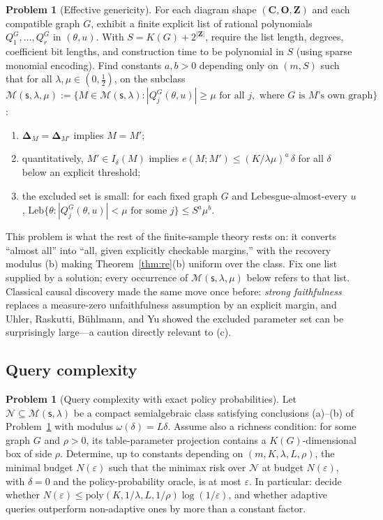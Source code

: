 \documentclass[11pt]{amsart}
\theoremstyle{plain}
\theoremstyle{definition}
\newtheorem{problem}[theorem]{Problem}
\newcommand{\bC}{\mathbf{C}}
\newcommand{\bO}{\mathbf{O}}
\newcommand{\bZ}{\mathbf{Z}}
\newcommand{\MM}{\mathcal{M}}
\newcommand{\sk}{\mathsf{s}}
\begin{document}
\begin{problem}[Effective genericity]\label{prob:effective}
For each diagram shape $(\bC,\bO,\bZ)$ and each compatible graph $G$, exhibit a finite explicit list of rational polynomials $Q^G_1,\dots,Q^G_r$ in $(\theta,u)$. With $S=K(G)+2^{|\bZ|}$, require the list length, degrees, coefficient bit lengths, and construction time to be polynomial in $S$ (using sparse monomial encoding). Find constants $a,b>0$ depending only on $(m,S)$ such that for all $\lambda,\mu\in(0,\tfrac12)$, on the subclass
$\MM(\sk,\lambda,\mu):=\{M\in\MM(\sk,\lambda): |Q^G_j(\theta,u)|\ge\mu \text{ for all } j, \text{ where } G \text{ is } M\text{'s own graph}\}$:
\begin{enumerate}
\item[(a)] $\boldsymbol\Delta_M=\boldsymbol\Delta_{M'}$ implies $M=M'$;
\item[(b)] quantitatively, $M'\in I_\delta(M)$ implies $e(M;M')\le (K/\lambda\mu)^{a}\,\delta$ for all $\delta$ below an explicit threshold;
\item[(c)] the excluded set is small: for each fixed graph $G$ and Lebesgue-almost-every $u$, $\mathrm{Leb}\bigl\{\theta: |Q^G_j(\theta,u)|<\mu \text{ for some } j\bigr\}\le S^{a}\mu^{b}$.
\end{enumerate}
\end{problem}

This problem is what the rest of the finite-sample theory rests on: it converts ``almost all'' into ``all, given explicitly checkable margins,'' with the recovery modulus (b) making Theorem~\ref{thm:re}(b) uniform over the class. Fix one list supplied by a solution; every occurrence of $\MM(\sk,\lambda,\mu)$ below refers to that list. Classical causal discovery made the same move once before: \emph{strong faithfulness} replaces a measure-zero unfaithfulness assumption by an explicit margin, and Uhler, Raskutti, B\"uhlmann, and Yu \cite{uhler2013} showed the excluded parameter set can be surprisingly large---a caution directly relevant to (c).

\subsection{Query complexity}

\begin{problem}[Query complexity with exact policy probabilities]\label{prob:exact}
Let $\mathcal{N}\subseteq\MM(\sk,\lambda)$ be a compact semialgebraic class satisfying conclusions (a)--(b) of Problem~\ref{prob:effective} with modulus $\omega(\delta)=L\delta$. Assume also a richness condition: for some graph $G$ and $\rho>0$, its table-parameter projection contains a $K(G)$-dimensional box of side $\rho$. Determine, up to constants depending on $(m,K,\lambda,L,\rho)$, the minimal budget $N(\varepsilon)$ such that the minimax risk over $\mathcal{N}$ at budget $N(\varepsilon)$, with $\delta=0$ and the policy-probability oracle, is at most $\varepsilon$. In particular: decide whether $N(\varepsilon)\le \mathrm{poly}(K,1/\lambda,L,1/\rho)\log(1/\varepsilon)$, and whether adaptive queries outperform non-adaptive ones by more than a constant factor.
\end{problem}
\end{document}
